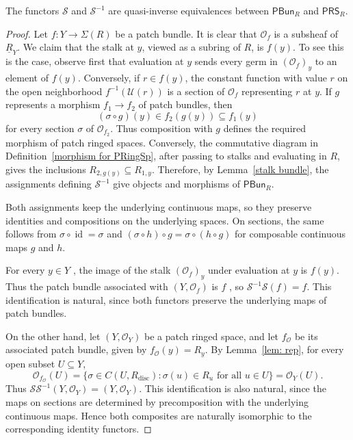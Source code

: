 \documentclass[11pt]{amsart}
\begin{document}
\begin{theorem}\label{thm: bundle ringed equivalence}
The functors $\mathcal S$ and $\mathcal S^{-1}$ are quasi-inverse equivalences between $\mathsf{PBun}_R$ and $\mathsf{PRS}_R$.
\end{theorem}
\begin{proof}
Let $f:Y \rightarrow \Sigma(R)$ be a patch bundle.  It is clear that $\mathcal O_f$ is a subsheaf of $\underline R_Y$. We claim that the stalk at $y$, viewed as a subring of $R$, is $f(y)$. To see this is the case, observe first that evaluation at $y$ sends every germ in $(\mathcal O_f)_y$
to an element of $f(y)$. Conversely, if $r\in f(y)$, the constant function with value $r$ on the open neighborhood $f^{-1}(\mathcal U(r))$ is a section of $\mathcal O_f$ representing $r$ at $y$.
If $g$ represents a morphism $f_1\to f_2$ of patch bundles, then
$$
(\sigma\circ g)(y)\in f_2(g(y))\subseteq f_1(y)
$$
for every section $\sigma$ of $\mathcal O_{f_2}$. Thus composition with $g$ defines the required morphism of patch ringed spaces. Conversely, the commutative diagram in Definition~\ref{morphism for PRingSp}, after passing to stalks and evaluating in $R$, gives the inclusions
$
R_{2,g(y)}\subseteq R_{1,y}.
$
Therefore, by Lemma~\ref{stalk bundle}, the assignments defining $\mathcal S^{-1}$  give objects and morphisms of $\mathsf{PBun}_R$. 

Both assignments keep the underlying continuous maps, so
they preserve identities and compositions on the underlying spaces. On sections, the same follows from $\sigma\circ\operatorname{id}=\sigma$ and $(\sigma\circ h)\circ g=\sigma\circ(h\circ g)$ for composable continuous maps $g$ and $h$.

For every $y\in Y$ , the image of the stalk $(\mathcal{O}_f)_y$ under evaluation at $y$ is $f(y)$. Thus the patch bundle associated with $(Y,\mathcal O_f)$ is $f$ , so $\mathcal S^{-1}\mathcal S(f)=f$. This identification is natural, since both functors preserve the underlying maps of patch bundles.

On the other hand, let $(Y,\mathcal O_Y)$ be a patch ringed space, and let $f_{\mathcal O}$ be its associated patch bundle, given by
$f_{\mathcal O}(y)=R_y$. By Lemma~\ref{lem: rep}, for every open
subset $U\subseteq Y$,
\[
\mathcal O_{f_{\mathcal O}}(U)
=
\{\sigma\in C(U,R_{\mathrm{disc}}):
\sigma(u)\in R_u\text{ for all }u\in U\}
=\mathcal O_Y(U).
\]
Thus $\mathcal S\mathcal S^{-1}(Y,\mathcal O_Y)
=(Y,\mathcal O_Y)$. This identification is also natural, since the maps on sections are determined by
precomposition with the underlying continuous maps. Hence both composites are naturally isomorphic to the corresponding identity
functors.
\end{proof}
\end{document}
